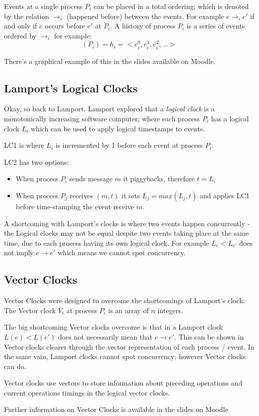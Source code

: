Events at a single process $P_i$ can be placed in a total ordering; which is denoted by the relation $\rightarrow_i$ (happened before) between the events. For example $e \rightarrow_i e'$ if and only if $e$ occurs before $e'$ at $P_i$. A history of process $P_i$ is a series of events ordered by $\rightarrow_i$ for example:
\[(P_i) = h_i = <e_i^0, e_i^1, e_i^2, \ldots >\]

\begin{extlink}
There's a graphical example of this in the slides available on Moodle.
\end{extlink}

\subsection{Lamport's Logical Clocks}
Okay, so back to Lamport. Lamport explored that a \textit{logical clock} is a monotonically increasing software computer; where each process $P_i$ has a logical clock $L_i$ which can be used to apply logical timestamps to events.

LC1 is where $L_i$ is incremented by 1 before each event at process $P_i$.

LC2 has two options:
\begin{itemize}
    \item When process $P_i$ sends message $m$ it piggybacks, therefore $t=L_i$
    \item When process $P_j$ receives $(m, t)$ it sets $L_j = max (L_j, t)$ and applies LC1 before time-stamping  the event receive $m$. 
\end{itemize}

A shortcoming with Lamport's clocks is where two events happen concurrently - the Logical clocks may not be equal despite two events taking place at the same time, due to each process having its own logical clock. For example $L_e < L_{e'}$ does not imply $e \rightarrow e'$ which means we cannot spot concurrency. 

\subsection{Vector Clocks}
Vector Clocks were designed to overcome the shortcomings of Lamport's clock. The Vector clock $V_i$ at process $P_i$ is an array of $n$ integers.

The big shortcoming Vector clocks overcome is that in a Lamport clock $L(e) < L(e')$ does not necessarily mean that $e \rightarrow e'$. This can be shown in Vector clocks clearer through the vector representation of each process / event. In the same vain, Lamport clocks cannot spot concurrency; however Vector clocks can do. 

Vector clocks use vectors to store information about preceding operations and current operations timings in the logical vector clocks. 

\begin{extlink}
Further information on Vector Clocks is available in the slides on Moodle
\end{extlink}